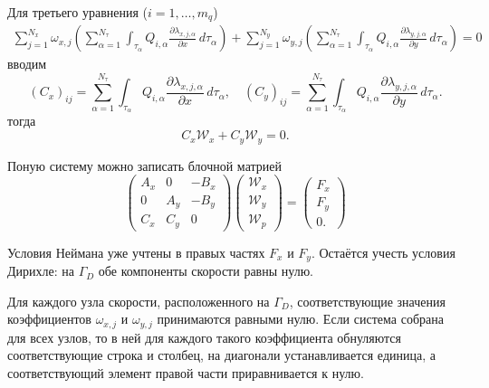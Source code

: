 \documentclass[a4paper,14pt]{extarticle}
\begin{document}
Для третьего уравнения ($i=1,\ldots,m_q$)
\begin{equation}
	\begin{gathered}
		\sum_{j=1}^{N_x}
		\omega_{x,j}
		\left(
			\sum_{\alpha=1}^{N_\tau}
			\int_{\tau_\alpha}
			Q_{i,\alpha}
			\frac{\partial\lambda_{x,j,\alpha}}{\partial x}
			\,d\tau_\alpha
		\right)
		+
		\sum_{j=1}^{N_y}
		\omega_{y,j}
		\left(
			\sum_{\alpha=1}^{N_\tau}
			\int_{\tau_\alpha}
			Q_{i,\alpha}
			\frac{\partial\lambda_{y,j,\alpha}}{\partial y}
			\,d\tau_\alpha
		\right)
		=0
	\end{gathered}
\end{equation}
вводим
\begin{equation}
		(C_x)_{ij}
		=
		\sum_{\alpha=1}^{N_\tau}
		\int_{\tau_\alpha}
		Q_{i,\alpha}
		\frac{\partial\lambda_{x,j,\alpha}}{\partial x}
		\,d\tau_\alpha,\quad
		(C_y)_{ij}
		=
		\sum_{\alpha=1}^{N_\tau}
		\int_{\tau_\alpha}
		Q_{i,\alpha}
		\frac{\partial\lambda_{y,j,\alpha}}{\partial y}
		\,d\tau_\alpha.
\end{equation}
тогда
\begin{equation}
	C_x\mathcal W_x+C_y\mathcal W_y=0.
\end{equation}

Поную систему можно записать блочной матрией
\begin{equation}
	\begin{pmatrix}
		A_x & 0 & -B_x\\
		0 & A_y & -B_y\\
		C_x & C_y & 0
		\end{pmatrix}
		\begin{pmatrix}
		\mathcal W_x\\
		\mathcal W_y\\
		\mathcal W_p
		\end{pmatrix}
		=
		\begin{pmatrix}
		F_x\\
		F_y\\
		0.
	\end{pmatrix}
\end{equation}

Условия Неймана уже учтены в правых частях $F_x$ и $F_y$.
Остаётся учесть условия Дирихле: на $\Gamma_D$ обе
компоненты скорости равны нулю.

Для каждого узла скорости, расположенного на $\Gamma_D$,
соответствующие значения коэффициентов $\omega_{x,j}$ и
$\omega_{y,j}$ принимаются равными нулю. Если система
собрана для всех узлов, то в ней для каждого такого
коэффициента обнуляются соответствующие строка и столбец,
на диагонали устанавливается единица, а соответствующий
элемент правой части приравнивается к нулю.
\end{document}
